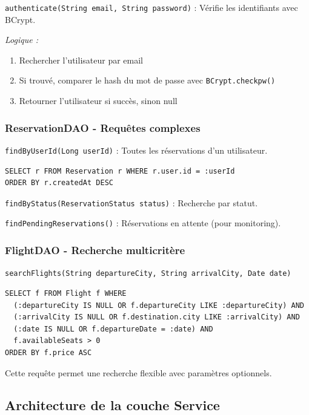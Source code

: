 \documentclass[12pt,a4paper]{report}
\begin{document}
\texttt{authenticate(String email, String password)} : Vérifie les identifiants avec BCrypt.

\textit{Logique :}
\begin{enumerate}
    \item Rechercher l'utilisateur par email
    \item Si trouvé, comparer le hash du mot de passe avec \texttt{BCrypt.checkpw()}
    \item Retourner l'utilisateur si succès, sinon null
\end{enumerate}

\subsubsection{ReservationDAO - Requêtes complexes}

\texttt{findByUserId(Long userId)} : Toutes les réservations d'un utilisateur.

\begin{verbatim}
SELECT r FROM Reservation r WHERE r.user.id = :userId 
ORDER BY r.createdAt DESC
\end{verbatim}

\texttt{findByStatus(ReservationStatus status)} : Recherche par statut.

\texttt{findPendingReservations()} : Réservations en attente (pour monitoring).

\subsubsection{FlightDAO - Recherche multicritère}

\texttt{searchFlights(String departureCity, String arrivalCity, Date date)}

\begin{verbatim}
SELECT f FROM Flight f WHERE 
  (:departureCity IS NULL OR f.departureCity LIKE :departureCity) AND
  (:arrivalCity IS NULL OR f.destination.city LIKE :arrivalCity) AND
  (:date IS NULL OR f.departureDate = :date) AND
  f.availableSeats > 0
ORDER BY f.price ASC
\end{verbatim}

Cette requête permet une recherche flexible avec paramètres optionnels.

\subsection{Architecture de la couche Service}
\end{document}
